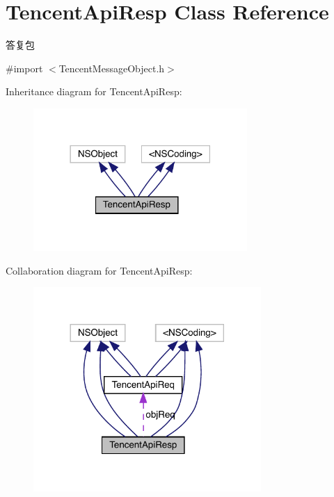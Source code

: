 \hypertarget{interface_tencent_api_resp}{}\section{Tencent\+Api\+Resp Class Reference}
\label{interface_tencent_api_resp}


答复包  




{\ttfamily \#import $<$Tencent\+Message\+Object.\+h$>$}



Inheritance diagram for Tencent\+Api\+Resp\+:\nopagebreak
\begin{figure}[H]
\begin{center}
\leavevmode
\includegraphics[width=230pt]{interface_tencent_api_resp__inherit__graph}
\end{center}
\end{figure}


Collaboration diagram for Tencent\+Api\+Resp\+:\nopagebreak
\begin{figure}[H]
\begin{center}
\leavevmode
\includegraphics[width=245pt]{interface_tencent_api_resp__coll__graph}
\end{center}
\end{figure}
